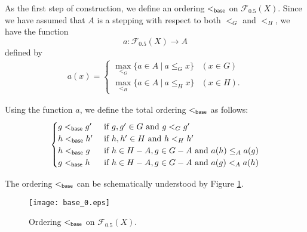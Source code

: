 \documentclass[10pt]{amsart}
\numberwithin{equation}{section}
\begin{document}
 

As the first step of construction, we define an ordering $<_{\sf base}$ on ${\mathcal{F}}_{0.5}(X)$. Since we have assumed that $A$ is a stepping with respect to both $<_{G}$ and $<_{H}$, we have the function
\[ a: {\mathcal{F}}_{0.5}(X) \rightarrow A \]
defined by 
\begin{gather}
\label{eqn:a}
a(x) = 
\begin{cases}
\max_{<_{G}} \{a \in A \: | \: a \leq_{G} x\} & (x \in G) \\
\max_{<_{H}} \{a \in A \: | \: a \leq_{H} x\} & (x \in H).
\end{cases}
\end{gather}
 
 Using the function $a$, we define the total ordering $<_{\sf base}$ as follows:
\begin{gather}
\label{eqn:base}
\begin{cases}
g <_{\sf base} g' & \text{ if } g, g' \in G \text{ and } g<_{G}g' \\
h <_{\sf base} h' & \text{ if } h, h' \in H \text{ and } h<_{H}h' \\
h <_{\sf base} g & \text{ if } h \in H-A, g \in G-A \text{ and } a(h) \leq_{A} a(g) \\
g <_{\sf base} h & \text{ if } h \in H-A, g \in G-A \text{ and } a(g) <_{A} a(h) \\
\end{cases}
\end{gather} 

The ordering $<_{\sf base}$ can be schematically understood by Figure \ref{fig:base}.

\begin{figure}[htbp]
 \begin{center}
\texttt{[image: base\_0.eps]}
\caption{Ordering $<_{\sf base}$ on ${\mathcal{F}}_{0.5}(X)$.}
\label{fig:base}
\end{center}
\end{figure}
\end{document}
